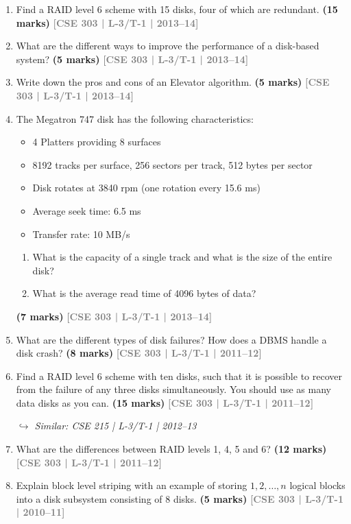 \documentclass[12pt]{article}
\newcommand{\yr}[1]{\hfill\textcolor{gray}{\small\textbf{[#1]}}}
\newcommand{\mk}[1]{\textcolor{orange!70!black}{\small\textbf{(#1 marks)}}}
\newcommand{\variant}[1]{\par\vspace{1pt}\textcolor{blue!50!black}%
  {\footnotesize\textit{$\hookrightarrow$ Similar: #1}}}
\begin{document}
\begin{enumerate}
\begin{center}
    \vspace{0.4cm}
    \textbf{Figure 2:} File containing records of relation \textit{department}(\underline{\textit{department code}}, \textit{location}, \textit{floors}, \textit{type})
\end{center}
\mk{15} \yr{CSE 303 | L-3/T-1 | 2014--15}


\item Find a RAID level 6 scheme with 15 disks, four of which are redundant.
\mk{15} \yr{CSE 303 | L-3/T-1 | 2013--14}


\item What are the different ways to improve the performance of a disk-based system?
\mk{5} \yr{CSE 303 | L-3/T-1 | 2013--14}


\item Write down the pros and cons of an Elevator algorithm.
\mk{5} \yr{CSE 303 | L-3/T-1 | 2013--14}


\item The Megatron 747 disk has the following characteristics:
\begin{itemize}[leftmargin=1.5em,itemsep=1pt]
  \item 4 Platters providing 8 surfaces
  \item 8192 tracks per surface, 256 sectors per track, 512 bytes per sector
  \item Disk rotates at 3840 rpm (one rotation every 15.6 ms)
  \item Average seek time: 6.5 ms
  \item Transfer rate: 10 MB/s
\end{itemize}
\begin{enumerate}
  \item What is the capacity of a single track and what is the size of the entire disk?
  \item What is the average read time of 4096 bytes of data?
\end{enumerate}
\mk{7} \yr{CSE 303 | L-3/T-1 | 2013--14}


\item What are the different types of disk failures? How does a DBMS handle a disk crash?
\mk{8} \yr{CSE 303 | L-3/T-1 | 2011--12}



\item Find a RAID level 6 scheme with ten disks, such that it is possible to recover from the failure of any three disks simultaneously. You should use as many data disks as you can.
\mk{15} \yr{CSE 303 | L-3/T-1 | 2011--12}
\variant{CSE 215 | L-3/T-1 | 2012--13}


\item What are the differences between RAID levels 1, 4, 5 and 6?
\mk{12} \yr{CSE 303 | L-3/T-1 | 2011--12}


\item Explain block level striping with an example of storing $1, 2, \ldots, n$ logical blocks into a disk subsystem consisting of 8 disks.
\mk{5} \yr{CSE 303 | L-3/T-1 | 2010--11}


\end{enumerate}
\end{document}
